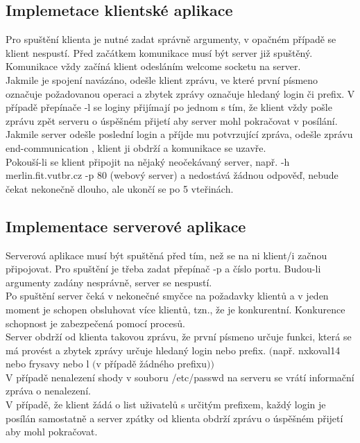 \documentclass[11pt]{article}
\begin{document}
		\subsection{Implemetace klientské aplikace}
			\begin{flushleft}
				Pro spuštění klienta je nutné zadat správně argumenty, v opačném případě se klient nespustí.	Před začátkem komunikace musí být server již spuštěný. Komunikace vždy začíná klient odesláním welcome socketu na server.\\[0.5 cm] 
				Jakmile je spojení navázáno, odešle klient zprávu, ve které první písmeno označuje požadovanou operaci a zbytek zprávy označuje hledaný login či prefix. V případě přepínače -l se loginy přijímají po jednom s tím, že klient vždy pošle zprávu zpět serveru o úspěšném přijetí aby server mohl pokračovat v posílání. Jakmile server odešle poslední login a příjde mu potvrzující zpráva, odešle zprávu end-communication , klient ji obdrží a komunikace se uzavře.\\[0.5 cm] 
				Pokouší-li se klient připojit na nějaký neočekávaný server, např. -h merlin.fit.vutbr.cz -p 80 (webový server) a nedostává žádnou odpověď, nebude čekat nekonečně dlouho, ale ukončí se po 5 vteřinách.\par		
			\end{flushleft}
			
		\subsection{Implementace serverové aplikace}
			\begin{flushleft}
				Serverová aplikace musí být spuštěná před tím, než se na ni klient/i začnou připojovat. Pro spuštění je třeba zadat přepínač -p a číslo portu. Budou-li argumenty zadány nesprávně, server se nespustí.\\[0.5 cm]
				Po spuštění server čeká v nekonečné smyčce na požadavky klientů a v jeden moment je schopen obsluhovat více klientů, tzn., že je konkurentní. Konkurence schopnost je zabezpečená pomocí procesů.\\[0.5 cm]
				Server obdrží od klienta takovou zprávu, že první písmeno určuje funkci, která se má provést a zbytek zprávy určuje hledaný login nebo prefix. $($např. nxkoval14 nebo frysavy nebo l $($v případě žádného prefixu$))$\\[0.5 cm]
				V případě nenalezení shody v souboru /etc/passwd na serveru se vrátí informační zpráva o nenalezení.\\[0.5 cm]
				V případě, že klient žádá o list uživatelů s určitým prefixem, každý login je posílán samostatně a server zpátky od klienta obdrží zprávu o úspěšném přijetí aby mohl pokračovat.\par
							
			\end{flushleft}	
\end{document}
